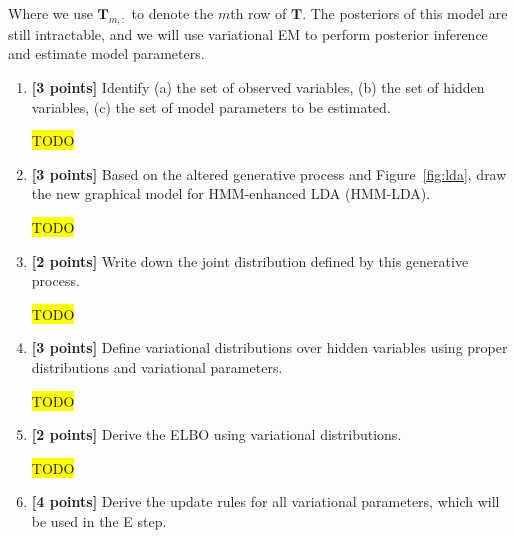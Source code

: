 \documentclass[10pt]{article}
\newcommand{\hilight}[1]{\colorbox{yellow}{#1}}
\begin{document}
Where we use $\bm{T}_{m, :}$ to denote the $m$th row of $\bm{T}$.
The posteriors of this model are still intractable, and we will use variational EM to perform posterior inference and estimate model parameters.
\begin{enumerate}
    \item \textbf{[3 points]} Identify (a) the set of observed variables, (b) the set of hidden variables, (c) the set of model parameters to be estimated.

\begin{solution}
\hilight{TODO}
\end{solution}

    \item \textbf{[3 points]} Based on the altered generative process and Figure~\ref{fig:lda}, draw the new graphical model for HMM-enhanced LDA (HMM-LDA).

\begin{solution}
\hilight{TODO}
\end{solution}

    \item \textbf{[2 points]} Write down the joint distribution defined by this generative process.

\begin{solution}
\hilight{TODO}
\end{solution}

    \item \textbf{[3 points]} Define variational distributions over hidden variables using proper distributions and variational parameters.

\begin{solution}
\hilight{TODO}
\end{solution}

    \item \textbf{[2 points]} Derive the ELBO using variational distributions.

\begin{solution}
\hilight{TODO}
\end{solution}

    \item \textbf{[4 points]} Derive the update rules for all variational parameters, which will be used in the E step.


\end{enumerate}
\end{document}
